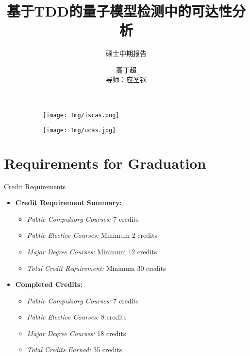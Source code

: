 \documentclass[aspectratio=1610]{beamer}
\title[Mid-term]{基于TDD的量子模型检测中的可达性分析}
\subtitle{硕士中期报告}
\author[Gcc]{高丁超\\ 导师：应圣钢}
\institute[ISCAS]{Institute of Software Chinese Academy of Sciences}
\begin{document}
\begin{frame}[plain]
    \titlepage
    \begin{figure}
        \centering
        \begin{subfigure}[c]{0.4\textwidth}
            \centering
            \texttt{[image: Img/iscas.png]}
        \end{subfigure}
        \qquad
        \begin{subfigure}[c]{0.4\textwidth}
            \centering
            \texttt{[image: Img/ucas.jpg]}
        \end{subfigure}
    \end{figure}
\end{frame}
\section{Requirements for Graduation}
\begin{frame}{Credit Requirements}
    \begin{itemize}
        \item \textbf{Credit Requirement Summary:}
        \begin{itemize}
            \item \textit{Public Compulsory Courses:} 7 credits
            \item \textit{Public Elective Courses:} Minimum 2 credits
            \item \textit{Major Degree Courses:} Minimum 12 credits
            \item \textit{Total Credit Requirement:} Minimum 30 credits
        \end{itemize}
        \item \textbf{Completed Credits:}
        \begin{itemize}
            \item \textit{Public Compulsory Courses:} 7 credits
            \item \textit{Public Elective Courses:} 8 credits
            \item \textit{Major Degree Courses:} 18 credits
            \item \textit{Total Credits Earned:} 35 credits
        \end{itemize}
    \end{itemize}
\end{frame}
\end{document}
